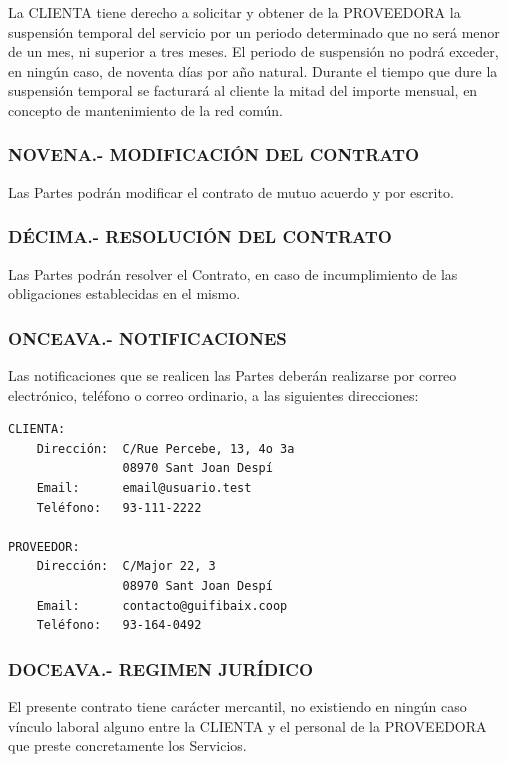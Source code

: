 \documentclass[11pt,spanish,a4paper,]{article}
\begin{document}
La CLIENTA tiene derecho a solicitar y obtener de la PROVEEDORA la
suspensión temporal del servicio por un periodo determinado que no será
menor de un mes, ni superior a tres meses. El periodo de suspensión no
podrá exceder, en ningún caso, de noventa días por año natural. Durante
el tiempo que dure la suspensión temporal se facturará al cliente la
mitad del importe mensual, en concepto de mantenimiento de la red común.

\subsubsection{NOVENA.- MODIFICACIÓN DEL
CONTRATO}\label{novena.--modificaciuxf3n-del-contrato}

Las Partes podrán modificar el contrato de mutuo acuerdo y por escrito.

\subsubsection{DÉCIMA.- RESOLUCIÓN DEL
CONTRATO}\label{duxe9cima.--resoluciuxf3n-del-contrato}

Las Partes podrán resolver el Contrato, en caso de incumplimiento de las
obligaciones establecidas en el mismo.

\subsubsection{ONCEAVA.- NOTIFICACIONES}\label{onceava.--notificaciones}

Las notificaciones que se realicen las Partes deberán realizarse por
correo electrónico, teléfono o correo ordinario, a las siguientes
direcciones:

\begin{verbatim}
CLIENTA:
    Dirección:  C/Rue Percebe, 13, 4o 3a
                08970 Sant Joan Despí
    Email:      email@usuario.test
    Teléfono:   93-111-2222

PROVEEDOR:
    Dirección:  C/Major 22, 3
                08970 Sant Joan Despí
    Email:      contacto@guifibaix.coop
    Teléfono:   93-164-0492
\end{verbatim}

\subsubsection{DOCEAVA.- REGIMEN
JURÍDICO}\label{doceava.--regimen-juruxeddico}

El presente contrato tiene carácter mercantil, no existiendo en ningún
caso vínculo laboral alguno entre la CLIENTA y el personal de la
PROVEEDORA que preste concretamente los Servicios.
\end{document}
